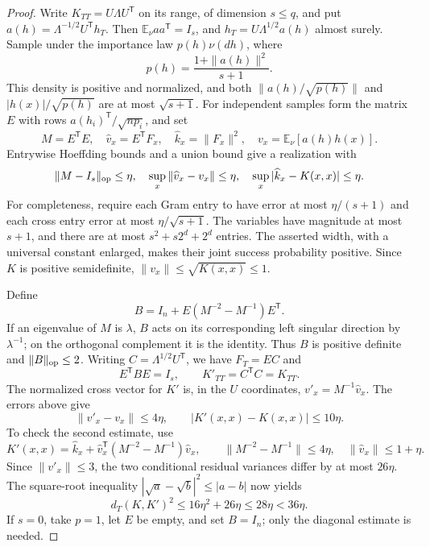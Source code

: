 \begin{proof}
Write $K_{TT}=U\Lambda U^{\mathsf T}$ on its range, of dimension
$s\le q$, and put $a(h)=\Lambda^{-1/2}U^{\mathsf T}h_T$.
Then $\mathbb E_\nu aa^{\mathsf T}=I_s$, and
$h_T=U\Lambda^{1/2}a(h)$ almost surely. Sample under the importance
law $p(h)\nu(dh)$, where
\[
 p(h)=\frac{1+\|a(h)\|^2}{s+1}.
\]
This density is positive and normalized, and both
$\|a(h)/\sqrt{p(h)}\|$ and $|h(x)|/\sqrt{p(h)}$ are at most
$\sqrt{s+1}$.
For independent samples form the matrix $E$ with rows
$a(h_i)^{\mathsf T}/\sqrt{np_i}$, and set
\[
 M=E^{\mathsf T}E,\quad
 \widehat v_x=E^{\mathsf T}F_x,\quad
 \widehat k_x=\|F_x\|^2,\quad
 v_x=\mathbb E_\nu[a(h)h(x)].
\]
Entrywise Hoeffding bounds and a union bound give a realization with
\begin{equation}\label{eq:critical-anchor-quadrature-errors}
 \|M-I_s\|_{\rm op}\le\eta,\quad
 \sup_x\|\widehat v_x-v_x\|\le\eta,\quad
 \sup_x|\widehat k_x-K(x,x)|\le\eta.
\end{equation}
For completeness, require each Gram entry to have error at most
$\eta/(s+1)$ and each cross entry error at most
$\eta/\sqrt{s+1}$. The variables have magnitude at most $s+1$,
and there are at most $s^2+s2^d+2^d$ entries. The asserted width,
with a universal constant enlarged, makes their joint success
probability positive. Since $K$ is positive semidefinite,
$\|v_x\|\le\sqrt{K(x,x)}\le1$.

Define
\[
 B=I_n+E(M^{-2}-M^{-1})E^{\mathsf T}.
\]
If an eigenvalue of $M$ is $\lambda$, $B$ acts on its corresponding
left singular direction by $\lambda^{-1}$; on the orthogonal
complement it is the identity. Thus $B$ is positive definite and
$\|B\|_{\rm op}\le2$. Writing $C=\Lambda^{1/2}U^{\mathsf T}$,
we have $F_T=EC$ and
\[
 E^{\mathsf T}BE=I_s,\qquad
 K'_{TT}=C^{\mathsf T}C=K_{TT}.
\]
The normalized cross vector for $K'$ is, in the $U$ coordinates,
$v'_x=M^{-1}\widehat v_x$. The errors above give
\[
 \|v'_x-v_x\|\le4\eta,\qquad
 |K'(x,x)-K(x,x)|\le10\eta.
\]
To check the second estimate, use
\[
 K'(x,x)=\widehat k_x+
        \widehat v_x^{\mathsf T}(M^{-2}-M^{-1})\widehat v_x,
 \qquad \|M^{-2}-M^{-1}\|\le4\eta,
 \quad\|\widehat v_x\|\le1+\eta.
\]
Since $\|v'_x\|\le3$, the two conditional residual variances
differ by at most $26\eta$. The square-root inequality
$|\sqrt a-\sqrt b|^2\le|a-b|$ now yields
\[
 d_T(K,K')^2\le16\eta^2+26\eta\le28\eta<36\eta.
\]
If $s=0$, take $p=1$, let $E$ be empty, and set $B=I_n$;
only the diagonal estimate is needed.
\end{proof}

